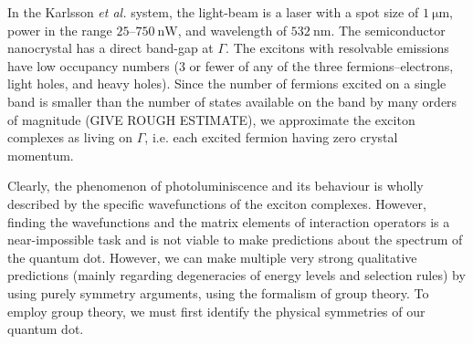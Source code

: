 In the Karlsson \textit{et al.} system, the light-beam is a laser with a spot size of $\SI{1}{\micro\metre}$, power in the range $25$--$\SI{750}{\nano\watt}$, and wavelength of $\SI{532}{\nano\metre}$. The semiconductor nanocrystal has a direct band-gap at $\Gamma$. The excitons with resolvable emissions have low occupancy numbers (3 or fewer of any of the three fermions--electrons, light holes, and heavy holes). Since the number of fermions excited on a single band is smaller than the number of states available on the band by many orders of magnitude (GIVE ROUGH ESTIMATE), we approximate the exciton complexes as living on $\Gamma$, i.e. each excited fermion having zero crystal momentum.

Clearly, the phenomenon of photoluminiscence and its behaviour is wholly described by the specific wavefunctions of the exciton complexes. However, finding the wavefunctions and the matrix elements of interaction operators is a near-impossible task and is not viable to make predictions about the spectrum of the quantum dot. However, we can make multiple very strong qualitative predictions (mainly regarding degeneracies of energy levels and selection rules) by using purely symmetry arguments, using the formalism of group theory. To employ group theory, we must first identify the physical symmetries of our quantum dot.

